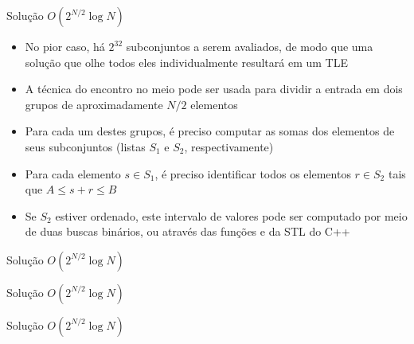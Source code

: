 \begin{frame}[fragile]{Solução $O(2^{N/2}\log N)$}

    \begin{itemize}
        \item No pior caso, há $2^{32}$ subconjuntos a serem avaliados, de modo que uma solução
            que olhe todos eles individualmente resultará em um TLE

        \item A técnica do encontro no meio pode ser usada para dividir a entrada em dois
            grupos de aproximadamente $N/2$ elementos

        \item Para cada um destes grupos, é preciso computar as somas dos elementos de seus
            subconjuntos (listas $S_1$ e $S_2$, respectivamente)

        \item Para cada elemento $s\in S_1$, é preciso identificar todos os elementos $r\in S_2$
            tais que $A\leq s + r\leq B$

        \item Se $S_2$ estiver ordenado, este intervalo de valores pode ser computado por meio
            de duas buscas binários, ou através das funções  e
             da STL do C++

    \end{itemize}

\end{frame}

\begin{frame}[fragile]{Solução $O(2^{N/2}\log N)$}
\end{frame}

\begin{frame}[fragile]{Solução $O(2^{N/2}\log N)$}
\end{frame}

\begin{frame}[fragile]{Solução $O(2^{N/2}\log N)$}
\end{frame}


